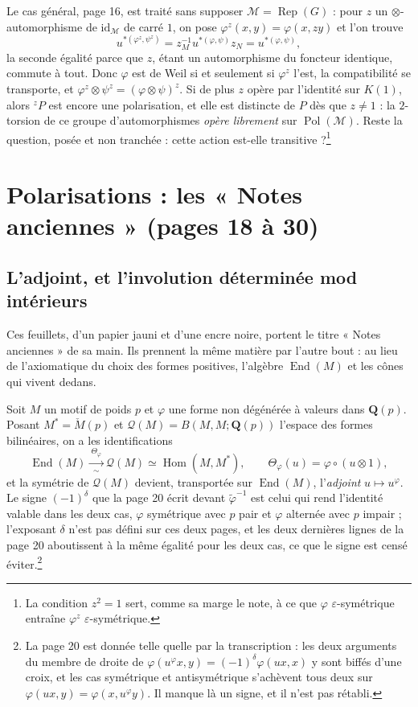 \documentclass[11pt,a4paper]{article}
\begin{document}
Le cas général, page 16, est traité sans supposer $\mathcal{M} =
\operatorname{Rep}(G)$ : pour $z$ un $\otimes$-automorphisme de
$\mathrm{id}_{\mathcal{M}}$ de carré $1$, on pose $\varphi^{z}(x,y) =
\varphi(x, zy)$ et l'on trouve
\[
u^{*(\varphi^{z}, \psi^{z})} = z_{M}^{-1} u^{*(\varphi,\psi)} z_{N}
= u^{*(\varphi,\psi)} ,
\]
la seconde égalité parce que $z$, étant un automorphisme du foncteur identique,
commute à tout. Donc $\varphi$ est de Weil si et seulement si $\varphi^{z}$
l'est, la compatibilité se transporte, et $\varphi^{z} \otimes \psi^{z} =
(\varphi \otimes \psi)^{z}$. Si de plus $z$ opère par l'identité sur $K(1)$,
alors ${}^{z}P$ est encore une polarisation, et elle est distincte de $P$ dès
que $z \neq 1$ : la $2$-torsion de ce groupe d'automorphismes \emph{opère
librement} sur $\operatorname{Pol}(\mathcal{M})$. Reste la question, posée et
non tranchée : cette action est-elle transitive ?\footnote{La condition
$z^{2} = 1$ sert, comme sa marge le note, à ce que $\varphi$
$\varepsilon$-symétrique entraîne $\varphi^{z}$ $\varepsilon$-symétrique.}

\section*{Polarisations : les « Notes anciennes » (pages 18 à 30)}

\subsection*{L'adjoint, et l'involution déterminée mod intérieurs}

Ces feuillets, d'un papier jauni et d'une encre noire, portent le titre « Notes
anciennes » de sa main. Ils prennent la même matière par l'autre bout : au lieu de
l'axiomatique du choix des formes positives, l'algèbre
$\operatorname{End}(M)$ et les cônes qui vivent dedans.

Soit $M$ un motif de poids $p$ et $\varphi$ une forme non dégénérée à valeurs
dans $\mathbf{Q}(p)$. Posant $M^{*} = \check{M}(p)$ et
$\mathcal{Q}(M) = B(M, M ; \mathbf{Q}(p))$ l'espace des formes bilinéaires, on
a les identifications
\[
\operatorname{End}(M)
\xrightarrow[\ \sim\ ]{\ \Theta_{\varphi}\ }
\mathcal{Q}(M) \simeq \operatorname{Hom}(M, M^{*}) ,
\qquad
\Theta_{\varphi}(u) = \varphi \circ (u \otimes 1) ,
\]
et la symétrie de $\mathcal{Q}(M)$ devient, transportée sur
$\operatorname{End}(M)$, l'\emph{adjoint} $u \mapsto u^{\varphi}$. Le signe
$(-1)^{\delta}$ que la page 20 écrit devant $\tilde{\varphi}^{-1}$ est celui
qui rend l'identité valable dans les deux cas, $\varphi$ symétrique avec $p$
pair et $\varphi$ alternée avec $p$ impair ; l'exposant $\delta$ n'est pas
défini sur ces deux pages, et les deux dernières lignes de la page 20
aboutissent à la même égalité pour les deux cas, ce que le signe est
censé éviter.\footnote{La page 20 est donnée telle quelle par la
transcription : les deux arguments du membre de droite de
$\varphi(u^{\varphi}x,y) = (-1)^{\delta}\varphi(ux,x)$ y sont biffés d'une
croix, et les cas symétrique et antisymétrique s'achèvent tous deux sur
$\varphi(ux,y) = \varphi(x, u^{\varphi}y)$. Il manque là un signe, et il n'est
pas rétabli.}
\end{document}
